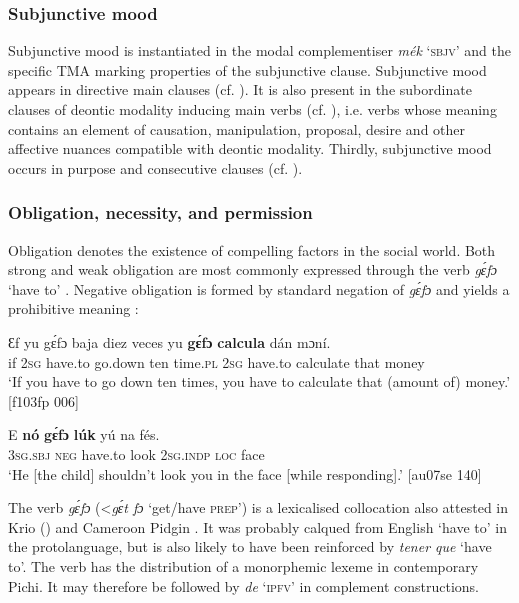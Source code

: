 \subsubsection{Subjunctive mood}\label{sec:6.7.3.1}

Subjunctive mood is instantiated in the modal complementiser \textit{mék} ‘\textsc{sbjv}’ and the specific TMA marking properties of the subjunctive clause. Subjunctive mood appears in directive main clauses (cf. ). It is also present in the subordinate clauses of deontic modality inducing main verbs (cf. ), i.e. verbs whose meaning contains an element of causation, manipulation, proposal, desire and other affective nuances compatible with deontic modality. Thirdly, subjunctive mood occurs in purpose and consecutive clauses (cf. ).

\subsubsection{Obligation, necessity, and permission}\label{sec:6.7.3.2}

Obligation denotes the existence of compelling factors in the social world. Both strong and weak obligation are most commonly expressed through the verb \textit{gɛ́fɔ} ‘have to’ . Negative obligation is formed by standard negation of \textit{gɛ́fɔ} and yields a prohibitive{\fff} meaning : 


\ea%
    \label{ex:key:414}
    \gll Ɛf  yu  gɛ́fɔ    baja    diez  veces  yu  \textbf{gɛ́fɔ}
\textbf{calcula}    dán  mɔní.\\
if  \textsc{2sg}  have.to  go.down  ten  time.\textsc{pl}  \textsc{2sg}  have.to  
calculate    that  money\\

\glt ‘If you have to go down ten times, you have to calculate that 
(amount of) money.’ [f103fp 006]
\z


\ea%
    \label{ex:key:415}
    \gll E    \textbf{nó}  \textbf{gɛ́fɔ}    \textbf{lúk}    yú    na  fés.\\
\textsc{3sg.sbj}  \textsc{neg}  have.to  look    \textsc{2sg.indp}  \textsc{loc}  face\\

\glt ‘He [the child] shouldn’t look you in the face [while responding].’ [au07se 140]
\z

The verb \textit{gɛ́fɔ} (<\textit{gɛ́t fɔ} ‘get/have \textsc{prep}’) is a lexicalised collocation also attested in Krio (\citealt{FyleJones1980}) and Cameroon Pidgin \citep{Nkengasong2016}. It was probably calqued from English ‘have to’ in the protolanguage, but is also likely to have been reinforced by  \textit{tener que} ‘have to’. The verb has the distribution of a monorphemic lexeme in contemporary Pichi. It may therefore be followed by \textit{de} ‘\textsc{ipfv}’ in complement constructions. 


